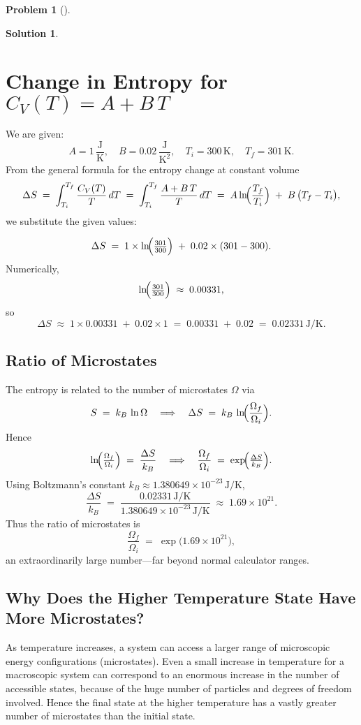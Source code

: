 \documentclass[12pt]{article}
\theoremstyle{definition} %
\newtheorem{solution}{Solution}
\newtheorem{problem}{Problem}
\theoremstyle{plain} %
\begin{document}
\begin{problem}[]
    
\end{problem}
\begin{solution}
    \section*{Change in Entropy for \texorpdfstring{$C_V(T) = A + B\,T$}{CV(T) = A + B T}}
We are given:
\[
A = 1\,\frac{\text{J}}{\text{K}}, 
\quad 
B = 0.02\,\frac{\text{J}}{\text{K}^2},
\quad
T_i = 300\,\text{K},
\quad
T_f = 301\,\text{K}.
\]
From the general formula for the entropy change at constant volume
\[
\Delta S 
\;=\; \int_{T_i}^{T_f} \frac{C_V(T)}{T}\,dT
\;=\; \int_{T_i}^{T_f} \frac{A + B\,T}{T}\,dT
\;=\; A \ln\!\Bigl(\frac{T_f}{T_i}\Bigr) 
\;+\; B\,\bigl(T_f - T_i\bigr),
\]
we substitute the given values:

\[
\Delta S 
\;=\; 1 \times \ln\!\Bigl(\tfrac{301}{300}\Bigr) 
\;+\; 0.02 \times (301 - 300).
\]
Numerically,
\[
\ln\!\Bigl(\tfrac{301}{300}\Bigr) \;\approx\; 0.00331,
\]
so
\[
\Delta S 
\;\approx\; 1 \times 0.00331 \;+\; 0.02 \times 1 
\;=\; 0.00331 \;+\; 0.02 
\;=\; 0.02331 \,\text{J/K}.
\]

\subsection*{Ratio of Microstates}
The entropy is related to the number of microstates $\Omega$ via
\[
S \;=\; k_B \,\ln \Omega 
\quad\Longrightarrow\quad
\Delta S 
\;=\; k_B \,\ln\!\Bigl(\frac{\Omega_f}{\Omega_i}\Bigr).
\]
Hence
\[
\ln\!\Bigl(\tfrac{\Omega_f}{\Omega_i}\Bigr)
\;=\;
\frac{\Delta S}{k_B}
\quad\Longrightarrow\quad
\frac{\Omega_f}{\Omega_i}
\;=\;
\exp\!\Bigl(\tfrac{\Delta S}{k_B}\Bigr).
\]
Using Boltzmann's constant $k_B \approx 1.380649\times 10^{-23}\,\text{J/K}$,
\[
\frac{\Delta S}{k_B}
\;=\;
\frac{0.02331\,\text{J/K}}{1.380649\times 10^{-23}\,\text{J/K}}
\;\approx\;
1.69\times 10^{21}.
\]
Thus the ratio of microstates is
\[
\frac{\Omega_f}{\Omega_i}
\;=\;
\exp\bigl(1.69\times 10^{21}\bigr),
\]
an extraordinarily large number---far beyond normal calculator ranges.

\subsection*{Why Does the Higher Temperature State Have More Microstates?}

As temperature increases, a system can access a larger range of 
microscopic energy configurations (microstates). Even a small increase 
in temperature for a macroscopic system can correspond to an enormous 
increase in the number of accessible states, because of the huge number 
of particles and degrees of freedom involved. Hence the final state at 
the higher temperature has a vastly greater number of microstates than 
the initial state.
\end{solution}
\end{document}
